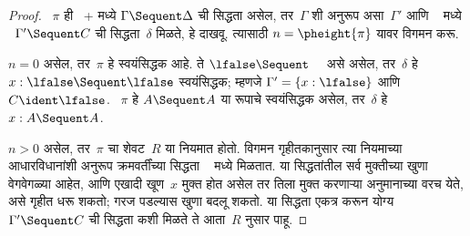 \begin{proof}
  ~$\pi$ ही~ + \Cut मध्ये
  $\Gamma \Sequent \Delta$ ची
  सिद्धता असेल, तर~$\Gamma$
  शी अनुरूप असा~$\Gamma'$ आणि
  ~ मध्ये
  ~$\Gamma' \Sequent C$ ची
  सिद्धता~$\delta$ मिळते,
  हे दाखवू. त्यासाठी
  $n = \pheight{\pi}$
  यावर विगमन करू.

  $n = 0$ असेल, तर~$\pi$
  हे स्वयंसिद्धक आहे.
  ते $\lfalse \Sequent \quad$
  असे असेल, तर~$\delta$
  हे $x:\lfalse \Sequent \lfalse$
  स्वयंसिद्धक; म्हणजे
  $\Gamma' = \{x:\lfalse\}$
  आणि $C \ident \lfalse$.
  ~$\pi$ हे $A \Sequent A$
  या रूपाचे स्वयंसिद्धक असेल,
  तर~$\delta$ हे
  $x: A \Sequent A$.

  $n>0$ असेल, तर~$\pi$
  चा शेवट~$R$ या नियमात होतो.
  विगमन गृहीतकानुसार त्या नियमाच्या
  आधारविधानांशी अनुरूप क्रमवर्तींच्या
  सिद्धता ~ मध्ये मिळतात.
  या सिद्धतांतील सर्व मुक्तीच्या खुणा
  वेगवेगळ्या आहेत, आणि एखादी खूण~$x$
  मुक्त होत असेल तर तिला मुक्त करणाऱ्या
  अनुमानाच्या वरच येते, असे गृहीत धरू
  शकतो; गरज पडल्यास खुणा बदलू शकतो.
  या सिद्धता एकत्र करून योग्य
  $\Gamma' \Sequent C$ ची सिद्धता
  कशी मिळते ते आता~$R$ नुसार पाहू.


\end{proof}
